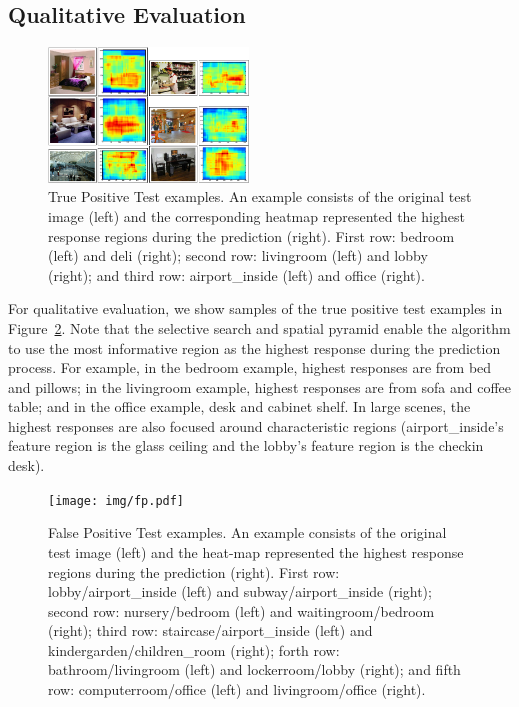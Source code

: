 \subsection{Qualitative Evaluation}
\begin{figure}[ht]
  \centering
  \includegraphics[width=0.475\textwidth]{img/tp.pdf}
  \centering
  \caption{True Positive Test examples. An example consists of the original test
image (left) and the corresponding heatmap represented the highest response
regions during the prediction (right). First row: bedroom (left) and deli
(right); second row: livingroom (left) and lobby (right); and third row:
airport\_inside (left) and office (right).}
  \label{fig:tp}
\end{figure}

For qualitative evaluation, we show samples of the true positive test examples
in Figure~\ref{fig:tp}. Note that the selective search and spatial pyramid
enable the algorithm to use the most informative region as the highest response
during the prediction process. For example, in the bedroom example, highest
responses are from bed and pillows; in the livingroom example, highest
responses are from sofa and coffee table; and in the office example, desk and
cabinet shelf. In large scenes, the highest responses are also focused around
characteristic regions (airport\_inside's feature region is the glass ceiling
and the lobby's feature region is the checkin desk).

\begin{figure}[ht]
  \centering
  \texttt{[image: img/fp.pdf]}
  \centering
  \caption{False Positive Test examples. An example consists of the original
test image (left) and the heat-map represented the highest response regions
during the prediction (right). First row: lobby/airport\_inside (left) and
subway/airport\_inside (right); second row: nursery/bedroom (left) and
waitingroom/bedroom (right); third row: staircase/airport\_inside (left) and
kindergarden/children\_room (right); forth row: bathroom/livingroom (left) and
lockerroom/lobby (right); and fifth row: computerroom/office (left) and
livingroom/office (right).}
  \label{fig:tp}
\end{figure}

